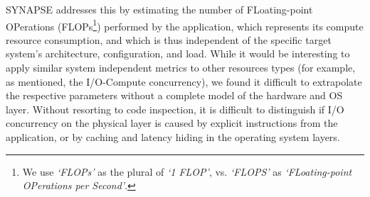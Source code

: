 \documentclass[preprint,12pt]{elsarticle}
\newcommand{\amnote}[1]{{\textcolor{magenta}    { ***Andre: #1 }}}
\newcommand{\amnote}[1]{}
\newcommand{\I}[1]{\textit{#1}\xspace}
\begin{document}
SYNAPSE addresses this by estimating the number of FLoating-point
OPerations (FLOPs\footnote{We use \I{`FLOPs'} as the plural of \I{`1
FLOP'}, vs. \I{`FLOPS'} as \I{`FLoating-point OPerations per
Second'}.}) performed by the application, which represents its
compute resource consumption, and which is thus independent of the
specific target system's architecture, configuration, and load.  While
it would be interesting to apply similar system independent metrics to
other resources types (for example, as mentioned, the I/O-Compute
concurrency), we found it difficult to extrapolate the respective
parameters without a complete model of the hardware and OS
layer. Without resorting to code inspection, it is difficult to distinguish 
if I/O concurrency on the physical layer is caused by explicit 
instructions from the application, or by caching and latency hiding 
in the operating system layers. 

\end{document}
